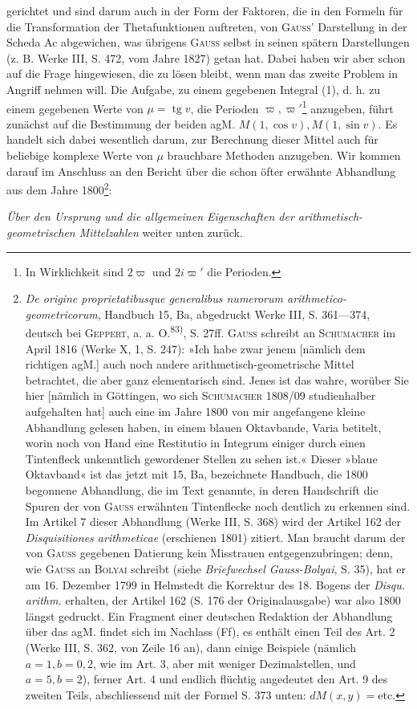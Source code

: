 gerichtet und sind darum auch in der Form der Faktoren, die in den Formeln
für die Transformation der Thetafunktionen auftreten, von \textsc{Gauss'} Darstellung
in der Scheda Ac abgewichen, was übrigens \textsc{Gauss} selbst in seinen spätern
Darstellungen (z. B. Werke III, S. 472, vom Jahre 1827) getan hat. Dabei
haben wir aber schon auf die Frage hingewiesen, die zu lösen bleibt, wenn
man das zweite Problem in Angriff nehmen will. Die Aufgabe, zu einem
gegebenen Integral (1), d. h. zu einem gegebenen Werte von \(\mu=\operatorname{tg}v\), die
Perioden \(\varpi,\varpi'\)\footnote{In Wirklichkeit sind \(2\varpi\) und \(2i\varpi'\) die Perioden.} anzugeben, führt zunächst auf die Bestimmung der beiden
agM. \(M(1,\cos v),M(1,\sin v)\). Es handelt sich dabei wesentlich darum, zur
Berechnung dieser Mittel auch für beliebige komplexe Werte von \(\mu\) brauchbare Methoden anzugeben. Wir kommen darauf im Anschluss an den Bericht über die schon öfter erwähnte Abhandlung aus dem Jahre 1800\footnote{\textit{De origine proprietatibusque generalibus numerorum arithmetico-geometricorum}, Handbuch 15, Ba,
abgedruckt Werke III, S. 361—374, deutsch bei \textsc{Geppert}, a. a. O.\textsuperscript{83)}, S. 27ff. \textsc{Gauss} schreibt an \textsc{Schumacher} im April 1816 (Werke X, 1, S. 247): »Ich habe zwar  jenem [nämlich dem richtigen agM.] auch noch andere arithmetisch-geometrische Mittel betrachtet, die aber ganz elementarisch sind. Jenes ist das wahre, worüber Sie hier [nämlich in Göttingen, wo sich \textsc{Schumacher} 1808/09 studienhalber aufgehalten hat] auch eine im Jahre 1800 von mir angefangene kleine Abhandlung gelesen haben, in einem blauen Oktavbande, Varia betitelt, worin noch von  Hand eine Restitutio in Integrum einiger durch einen Tintenfleck unkenntlich gewordener Stellen zu sehen ist.« Dieser »blaue Oktavband« ist das jetzt mit 15, Ba, bezeichnete Handbuch, die 1800 begonnene Abhandlung, die im Text genannte, in deren Handschrift die Spuren der von \textsc{Gauss} erwähnten Tintenflecke noch deutlich zu erkennen sind.
Im Artikel 7 dieser Abhandlung (Werke III, S. 368) wird der Artikel 162 der \textit{Disquisitiones arithmeticae} (erschienen 1801) zitiert. Man braucht darum der von \textsc{Gauss} gegebenen Datierung kein Misstrauen entgegenzubringen; denn, wie \textsc{Gauss} an \textsc{Bolyai} schreibt (siehe \textit{Briefwechsel Gauss-Bolyai}, S. 35), hat er am 16. Dezember 1799 in Helmstedt die Korrektur des 18. Bogens der \textit{Disqu. arithm.} erhalten, der Artikel 162 (S. 176 der Originalausgabe) war also 1800 längst gedruckt. Ein Fragment einer deutschen Redaktion der Abhandlung über das agM. findet sich im Nachlass (Ff), es enthält einen Teil des Art. 2 (Werke III, S. 362, von Zeile 16 an), dann einige Beispiele (nämlich \(a=1,b=0{,}2\), wie im Art. 3, aber mit weniger Dezimalstellen, und \(a=5,b=2\)), ferner Art. 4 und endlich flüchtig angedeutet den Art. 9 des zweiten Teils, abschliessend mit der Formel S. 373 unten: \(dM(x,y)=\mathrm{etc.}\)}:\par
\clearpage{}
\noindent \textit{Über den Ursprung und die allgemeinen Eigenschaften der arithmetisch-geometrischen Mittelzahlen} weiter unten zurück.

